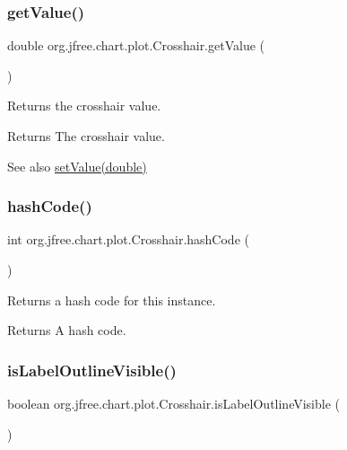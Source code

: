 \subsubsection{\texorpdfstring{get\+Value()}{getValue()}}
{\footnotesize\ttfamily double org.\+jfree.\+chart.\+plot.\+Crosshair.\+get\+Value (\begin{DoxyParamCaption}{ }\end{DoxyParamCaption})}

Returns the crosshair value.

\begin{DoxyReturn}{Returns}
The crosshair value.
\end{DoxyReturn}
\begin{DoxySeeAlso}{See also}
\mbox{\hyperlink{classorg_1_1jfree_1_1chart_1_1plot_1_1_crosshair_a8f53f7fe5b2f9f7ad0846a6b5f218079}{set\+Value(double)}} 
\end{DoxySeeAlso}
\mbox{\label{classorg_1_1jfree_1_1chart_1_1plot_1_1_crosshair_a378a5e3fec4effff766e0c2f2cb51e8f}} 
\subsubsection{\texorpdfstring{hash\+Code()}{hashCode()}}
{\footnotesize\ttfamily int org.\+jfree.\+chart.\+plot.\+Crosshair.\+hash\+Code (\begin{DoxyParamCaption}{ }\end{DoxyParamCaption})}

Returns a hash code for this instance.

\begin{DoxyReturn}{Returns}
A hash code. 
\end{DoxyReturn}
\mbox{\label{classorg_1_1jfree_1_1chart_1_1plot_1_1_crosshair_a92ee3a27945a3c6d16aee1431700b233}} 
\subsubsection{\texorpdfstring{is\+Label\+Outline\+Visible()}{isLabelOutlineVisible()}}
{\footnotesize\ttfamily boolean org.\+jfree.\+chart.\+plot.\+Crosshair.\+is\+Label\+Outline\+Visible (\begin{DoxyParamCaption}{ }\end{DoxyParamCaption})}

